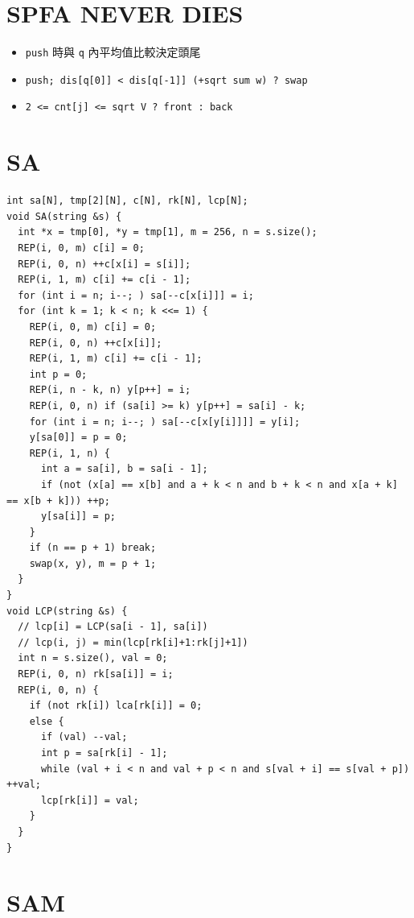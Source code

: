 \documentclass[10pt, a4paper, twocolumn]{article}
\begin{document}
\section{SPFA NEVER DIES}

\begin{itemize}[tight_item]
    \item \texttt{push} 時與 \texttt{q} 內平均值比較決定頭尾
    \item \texttt{push; dis[q[0]] < dis[q[-1]] (+sqrt sum w) ? swap}
    \item \texttt{2 <= cnt[j] <= sqrt V ? front : back}
\end{itemize}

\section{SA}

\begin{verbatim}
int sa[N], tmp[2][N], c[N], rk[N], lcp[N];
void SA(string &s) {
  int *x = tmp[0], *y = tmp[1], m = 256, n = s.size();
  REP(i, 0, m) c[i] = 0;
  REP(i, 0, n) ++c[x[i] = s[i]];
  REP(i, 1, m) c[i] += c[i - 1];
  for (int i = n; i--; ) sa[--c[x[i]]] = i;
  for (int k = 1; k < n; k <<= 1) {
    REP(i, 0, m) c[i] = 0;
    REP(i, 0, n) ++c[x[i]];
    REP(i, 1, m) c[i] += c[i - 1];
    int p = 0;
    REP(i, n - k, n) y[p++] = i;
    REP(i, 0, n) if (sa[i] >= k) y[p++] = sa[i] - k;
    for (int i = n; i--; ) sa[--c[x[y[i]]]] = y[i];
    y[sa[0]] = p = 0;
    REP(i, 1, n) {
      int a = sa[i], b = sa[i - 1];
      if (not (x[a] == x[b] and a + k < n and b + k < n and x[a + k] == x[b + k])) ++p;
      y[sa[i]] = p;
    }
    if (n == p + 1) break;
    swap(x, y), m = p + 1;
  }
}
void LCP(string &s) {
  // lcp[i] = LCP(sa[i - 1], sa[i])
  // lcp(i, j) = min(lcp[rk[i]+1:rk[j]+1])
  int n = s.size(), val = 0;
  REP(i, 0, n) rk[sa[i]] = i;
  REP(i, 0, n) {
    if (not rk[i]) lca[rk[i]] = 0;
    else {
      if (val) --val;
      int p = sa[rk[i] - 1];
      while (val + i < n and val + p < n and s[val + i] == s[val + p]) ++val;
      lcp[rk[i]] = val;
    }
  }
}
\end{verbatim}

\newpage

\section{SAM}
\end{document}
